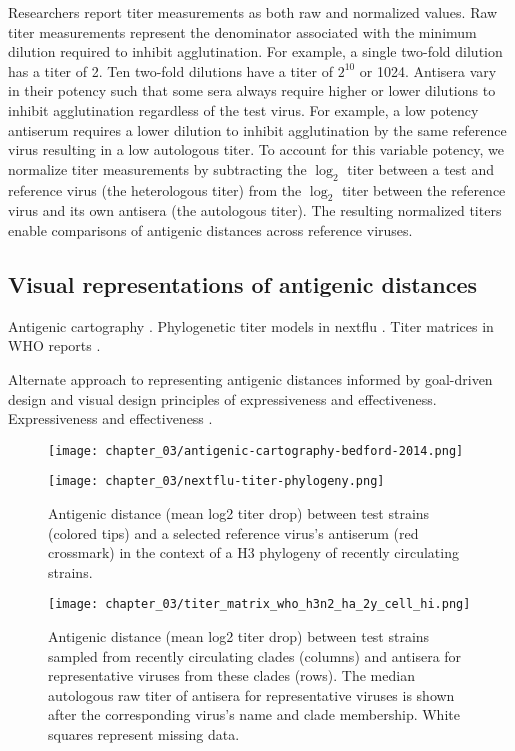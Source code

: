 Researchers report titer measurements as both raw and normalized values.
Raw titer measurements represent the denominator associated with the minimum dilution required to inhibit agglutination.
For example, a single two-fold dilution has a titer of 2.
Ten two-fold dilutions have a titer of $2^{10}$ or 1024.
Antisera vary in their potency such that some sera always require higher or lower dilutions to inhibit agglutination regardless of the test virus.
For example, a low potency antiserum requires a lower dilution to inhibit agglutination by the same reference virus resulting in a low autologous titer.
To account for this variable potency, we normalize titer measurements by subtracting the $\log_{2}$ titer between a test and reference virus (the heterologous titer) from the $\log_{2}$ titer between the reference virus and its own antisera (the autologous titer).
The resulting normalized titers enable comparisons of antigenic distances across reference viruses.

\subsection{Visual representations of antigenic distances}

Antigenic cartography \citep{Smith:2004jc,Bedford:2014bf}.
Phylogenetic titer models \citep{Neher:2016hy} in nextflu \citep{Neher:2015jr}.
Titer matrices in WHO reports \citep{Bedford113035,Bedford271114,Bedford780627}.

Alternate approach to representing antigenic distances informed by goal-driven design and visual design principles of expressiveness and effectiveness.
Expressiveness and effectiveness \citep{Mackinlay1986}.

\begin{figure}
  \centering
  \texttt{[image: chapter\_03/antigenic-cartography-bedford-2014.png]}
  \caption{\label{fig:antigenic-cartography-bedford-2014} }
\end{figure}

\begin{figure}
  \centering
  \texttt{[image: chapter\_03/nextflu-titer-phylogeny.png]}
  \caption{\label{fig:titer-phylogeny} Antigenic distance (mean log2 titer drop) between test strains (colored tips) and a selected reference virus's antiserum (red crossmark) in the context of a H3 phylogeny of recently circulating strains.}
\end{figure}

\begin{figure}
  \centering
  \texttt{[image: chapter\_03/titer\_matrix\_who\_h3n2\_ha\_2y\_cell\_hi.png]}
  \caption{\label{fig:titer-matrix} Antigenic distance (mean log2 titer drop) between test strains sampled from recently circulating clades (columns) and antisera for representative viruses from these clades (rows).
    The median autologous raw titer of antisera for representative viruses is shown after the corresponding virus's name and clade membership.
    White squares represent missing data.}
\end{figure}

